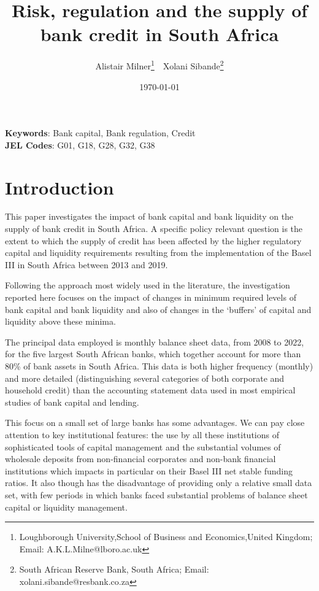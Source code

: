 \documentclass[
]{article}
\author{}
\date{\vspace{-2.5em}}
\begin{document}
\title{Risk, regulation and the supply of bank credit in South Africa}


\author { 
Alistair Milner\footnote{Loughborough University,School of Business and Economics,United Kingdom; Email: A.K.L.Milne@lboro.ac.uk}  \,\, 
Xolani Sibande\footnote{South African Reserve Bank, South Africa; Email: xolani.sibande@resbank.co.za}
}
\date{\today}
\maketitle

\begin{abstract}


\end{abstract}

\noindent\textbf{Keywords}: Bank capital, Bank regulation, Credit   \\
\textbf{JEL Codes}: G01, G18, G28, G32, G38
\newpage

\hypertarget{introduction}{%
\section{Introduction}\label{introduction}}

This paper investigates the impact of bank capital and bank liquidity on the supply of bank credit in South Africa. A specific policy relevant question is the extent to which the supply of credit has been affected by the higher regulatory capital and liquidity requirements resulting from the implementation of the Basel III in South Africa between 2013 and 2019.

Following the approach most widely used in the literature, the investigation reported here focuses on the impact of changes in minimum required levels of bank capital and bank liquidity and also of changes in the `buffers' of capital and liquidity above these minima.

The principal data employed is monthly balance sheet data, from 2008 to 2022, for the five largest South African banks, which together account for more than 80\% of bank assets in South Africa. This data is both higher frequency (monthly) and more detailed (distinguishing several categories of both corporate and household credit) than the accounting statement data used in most empirical studies of bank capital and lending.

This focus on a small set of large banks has some advantages. We can pay close attention to key institutional features: the use by all these institutions of sophisticated tools of capital management and the substantial volumes of wholesale deposits from non-financial corporates and non-bank financial institutions which impacts in particular on their Basel III net stable funding ratios. It also though has the disadvantage of providing only a relative small data set, with few periods in which banks faced substantial problems of balance sheet capital or liquidity management.
\end{document}
